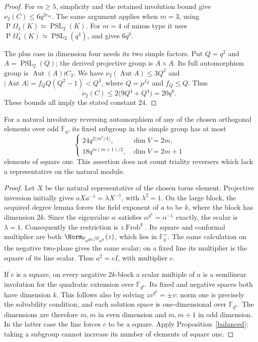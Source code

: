 \documentclass[11pt,a4paper]{article}
\newcommand{\F}{\mathbb F}\newcommand{\nuu}{\nu_2}
\begin{document}
\begin{proof}
For $m\ge5$, simplicity and the retained involution bound give
$\nuu(C)\le6q^{2e_m}$. The same argument applies when $m=3$, using
$\operatorname{P}\Omega_3(K)\simeq\operatorname{PSL}_2(K)$.
For $m=4$ of minus type it uses
$\operatorname{P}\Omega_4^-(K)\simeq\operatorname{PSL}_2(q^4)$,
and gives $6q^8$.

The plus case in dimension four needs its two simple factors. Put
$Q=q^2$ and $A=\operatorname{PSL}_2(Q)$; the derived projective group
is $A\times A$. Its full automorphism group is
$\operatorname{Aut}(A)\wr C_2$. We have
$\nuu(\operatorname{Aut}A)\le3Q^2$ and
$|\operatorname{Aut}A|=f_Q Q(Q^2-1)<Q^4$, where
$Q=p^{f_Q}$ and $f_Q\le Q$. Thus
\[
 \nuu(C)\le2\bigl(9Q^4+Q^4\bigr)=20q^8.
\]
These bounds all imply the stated constant $24$.
\end{proof}

\begin{proposition}\label{application}
For a natural involutory reversing automorphism of any of the chosen
orthogonal elements over odd $\F_q$, its fixed subgroup in the simple
group has at most
\[
 \begin{cases}
 24q^{2\lfloor m^2/4\rfloor},&\dim V=2m,\\
 18q^{m(m+1)/2},&\dim V=2m+1
 \end{cases}
\]
elements of square one. This assertion does not count triality
reversers which lack a representative on the natural module.
\end{proposition}
\begin{proof}
Let $X$ be the natural representative of the chosen torus element.
Projective inversion initially gives $aXa^{-1}=\lambda X^{-1}$,
with $\lambda^2=1$. On the large block, the acquired degree lemma
forces the field exponent of $a$ to be $k$, where the block has
dimension $2k$. Since the eigenvalue $\alpha$ satisfies
$\alpha^{q^k}=\alpha^{-1}$ exactly, the scalar is $\lambda=1$.
Consequently the restriction is $z\operatorname{Frob}^{k}$.
Its square and conformal multiplier are both
$\Norm_{\F_{q^{2k}}/\F_{q^k}}(z)$, which lies in $\F_q^\times$.
The same calculation on the negative two-plane gives the same scalar;
on a fixed line its multiplier is the square of its line scalar.
Thus $a^2=cI$, with multiplier $c$.

If $c$ is a square, on every negative $2k$-block a scalar multiple of
$a$ is a semilinear involution for the quadratic extension over
$\F_{q^k}$. Its fixed and negative spaces both have dimension $k$.
This follows also by solving $zv^{q^k}=\pm v$: norm one is precisely
the solvability condition, and each solution space is one-dimensional
over $\F_{q^k}$. The dimensions are therefore $m,m$ in even dimension
and $m,m+1$ in odd dimension. In the latter case the line forces $c$
to be a square. Apply Proposition~\ref{balanced}; taking a subgroup
cannot increase its number of elements of square one.
\end{proof}
\end{document}
